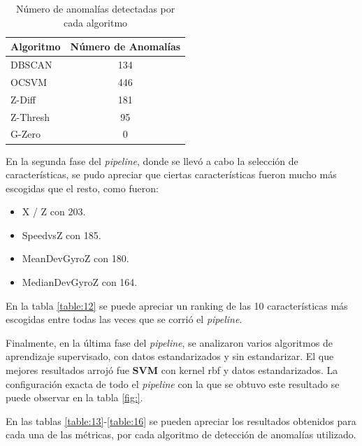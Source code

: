 	\begin{table}[htb]
		\centering
		\caption{Número de anomalías detectadas por cada algoritmo}
		\label{table:3}
		\begin{tabular}{lc}
			\toprule
			 Algoritmo &  Número de Anomalías \\
			\midrule
				DBSCAN &                  134 \\
				 OCSVM &                  446 \\
				Z-Diff &                  181 \\
			   Z-Thresh &                   95 \\
				G-Zero &                    0 \\
			\bottomrule
		\end{tabular}
		
	\end{table}

	En la segunda fase del \emph{pipeline}, donde se llevó a cabo la selección de características, se pudo apreciar que ciertas características fueron
	mucho más escogidas que el resto, como fueron: 

	\begin{itemize}
		\item X / Z con 203.
		\item SpeedvsZ con 185.
		\item MeanDevGyroZ con 180.
		\item MedianDevGyroZ con 164.
	\end{itemize}

	En la tabla \ref{table:12} se puede apreciar un ranking de las 10 características más escogidas entre todas las veces que se corrió el \emph{pipeline}.

	Finalmente, en la última fase del \emph{pipeline}, se analizaron varios algoritmos de aprendizaje supervisado, con datos estandarizados y sin
	estandarizar. El que mejores resultados arrojó fue \textbf{SVM} con kernel rbf y datos estandarizados. La configuración exacta de todo el
	\emph{pipeline} con la que se obtuvo este resultado se puede observar en la tabla \ref{fig:}.
	\newpage

	En las tablas \ref{table:13}-\ref{table:16} se pueden apreciar los resultados obtenidos para cada una de las métricas, por cada algoritmo de detección de 
	anomalías utilizado.

